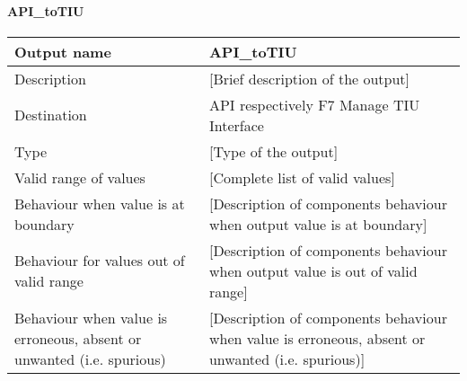 \paragraph{API\_toTIU}

\begin{longtable}{p{}p{}}
\toprule
Output name				& API\_toTIU \\
\midrule
Description				& [Brief description of the output] \\
\midrule
Destination				& API respectively F7 Manage TIU Interface \\ 
\midrule
Type					& [Type of the output] \\
\midrule
Valid range of values	& [Complete list of valid values] \\
\midrule
Behaviour when value is at boundary	& [Description of components behaviour when output value is at boundary] \\
\midrule
Behaviour for values out of valid range	& [Description of components behaviour when output value is out of valid range] \\
\midrule
Behaviour when value is erroneous, absent or unwanted (i.e. spurious) & [Description of components behaviour when value is erroneous, absent or unwanted (i.e. spurious)] \\
\bottomrule
\end{longtable}